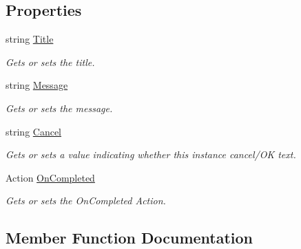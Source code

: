 \subsection*{Properties}
\begin{DoxyCompactItemize}
\item 
string \hyperlink{class_pocket_saver_1_1_helpers_1_1_messaging_center_alert_a827e20b3d05a529c16590e8e2da66b37}{Title}
\begin{DoxyCompactList}\small\item\em Gets or sets the title. \end{DoxyCompactList}\item 
string \hyperlink{class_pocket_saver_1_1_helpers_1_1_messaging_center_alert_addb98738912e05468902309cbb36a9f1}{Message}
\begin{DoxyCompactList}\small\item\em Gets or sets the message. \end{DoxyCompactList}\item 
string \hyperlink{class_pocket_saver_1_1_helpers_1_1_messaging_center_alert_a37febc8133ac7dc080702ace800b5d88}{Cancel}
\begin{DoxyCompactList}\small\item\em Gets or sets a value indicating whether this instance cancel/\+OK text. \end{DoxyCompactList}\item 
Action \hyperlink{class_pocket_saver_1_1_helpers_1_1_messaging_center_alert_a0c4bc9d96c3b04c593f24aec403742b4}{On\+Completed}
\begin{DoxyCompactList}\small\item\em Gets or sets the On\+Completed Action. \end{DoxyCompactList}\end{DoxyCompactItemize}


\subsection{Member Function Documentation}
\mbox{\label{class_pocket_saver_1_1_helpers_1_1_messaging_center_alert_a19c73557967c32f25efc4e973998ab7f}} 

